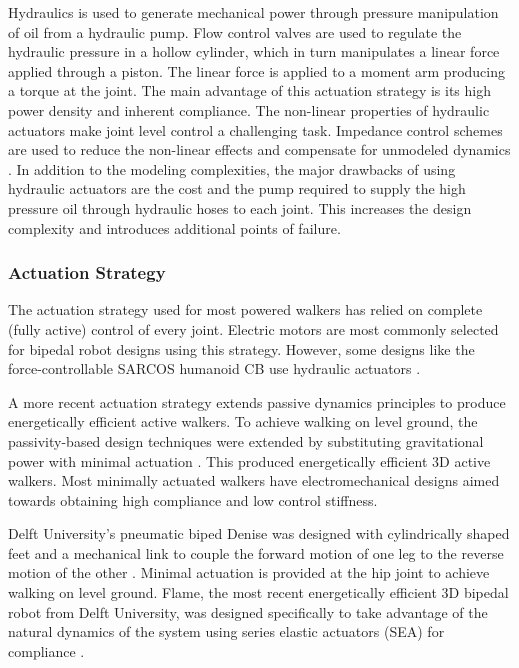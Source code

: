 Hydraulics is used to generate mechanical power through pressure manipulation of oil from a hydraulic pump. Flow control valves are used to regulate the hydraulic pressure in a hollow cylinder, which in turn manipulates a linear force applied through a piston. The linear force is applied to a moment arm producing a torque at the joint. The main advantage of this actuation strategy is its high power density and inherent compliance. The non-linear properties of hydraulic actuators make joint level control a challenging task. Impedance control schemes are used to reduce the non-linear effects and compensate for unmodeled dynamics \cite{Bilodeau1998}. In addition to the modeling complexities, the major drawbacks of using hydraulic actuators are the cost and the pump required to supply the high pressure oil through hydraulic hoses to each joint. This increases the design complexity and introduces additional points of failure.

\subsubsection{Actuation Strategy} %
\label{ssub:actuation_strategy}
The actuation strategy used for most powered walkers has relied on complete (fully active) control of every joint. Electric motors are most commonly selected for bipedal robot designs using this strategy. However, some designs like the force-controllable SARCOS humanoid CB use hydraulic actuators \cite{SangHoHyon:2007jy}. 

A more recent actuation strategy extends passive dynamics principles to produce energetically efficient active walkers. To achieve walking on level ground, the passivity-based design techniques were extended by substituting gravitational power with minimal actuation \cite{Spong:1999vk,Collins:2005vp}. This produced energetically efficient 3D active walkers. Most minimally actuated walkers have electromechanical designs aimed towards obtaining high compliance and low control stiffness.

Delft University's pneumatic biped Denise was designed with cylindrically shaped feet and a mechanical link to couple the forward motion of one leg to the reverse motion of the other \cite{Anderson:2005cw}. Minimal actuation is provided at the hip joint to achieve walking on level ground. Flame, the most recent energetically efficient 3D bipedal robot from Delft University, was designed specifically to take advantage of the natural dynamics of the system \cite{Hobbelen2008} using series elastic actuators (SEA) for compliance \cite{Pratt1995}. 

